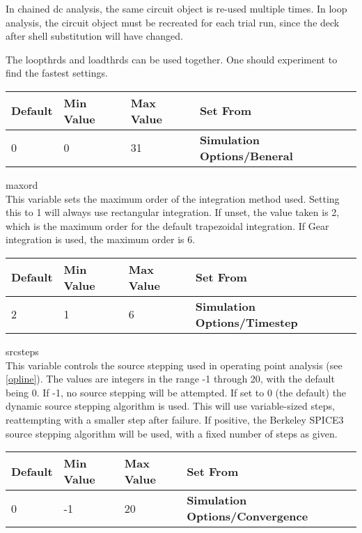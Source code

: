 \begin{description}
In chained dc analysis, the same circuit object is re-used multiple
times.  In loop analysis, the circuit object must be recreated for
each trial run, since the deck after shell substitution will have
changed.

The {\et loopthrds} and {\et loadthrds} can be used together.  One
should experiment to find the fastest settings.

\begin{tabular}{|l|l|l|l|}\hline
\bf Default & \bf Min Value & \bf Max Value & \bf Set From\\ \hline
0 & 0 & 31 & \bf Simulation Options/Beneral\\ \hline
\end{tabular}

\item{\et maxord}\\
This variable sets the maximum order of the integration method
used.  Setting this to 1 will always use rectangular integration.
If unset, the value taken is 2, which is the maximum order for the default
trapezoidal integration.  If Gear integration is used, the maximum
order is 6.

\begin{tabular}{|l|l|l|l|}\hline
\bf Default & \bf Min Value & \bf Max Value & \bf Set From\\ \hline
2 & 1 & 6 & \bf Simulation Options/Timestep\\ \hline
\end{tabular}

\item{\et srcsteps}\\
This variable controls the source stepping used in operating point
analysis (see \ref{opline}).  The values are integers in the range -1
through 20, with the default being 0.  If -1, no source stepping will
be attempted.  If set to 0 (the default) the dynamic source stepping
algorithm is used.  This will use variable-sized steps, reattempting
with a smaller step after failure.  If positive, the Berkeley SPICE3
source stepping algorithm will be used, with a fixed number of steps
as given.

\begin{tabular}{|l|l|l|l|}\hline
\bf Default & \bf Min Value & \bf Max Value & \bf Set From\\ \hline
0 & -1 & 20 & \bf Simulation Options/Convergence\\ \hline
\end{tabular}
\end{description}

